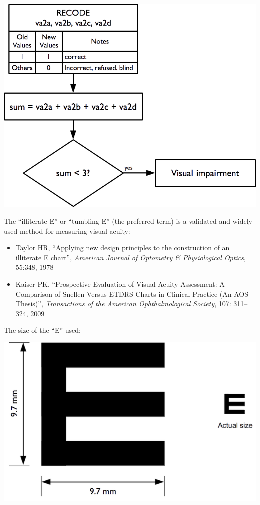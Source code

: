 \documentclass[12pt,a4paper]{book}
\theoremstyle{definition}
\theoremstyle{definition}
\theoremstyle{definition}
\theoremstyle{remark}
\begin{document}
\begin{center}\includegraphics[width=9.76in]{figures/indicators27} \end{center}

The ``illiterate E'' or ``tumbling E'' (the preferred term) is a
validated and widely used method for measuring visual acuity:

\begin{itemize}
\item
  Taylor HR, ``Applying new design principles to the construction of an
  illiterate E chart'', \emph{American Journal of Optometry \&
  Physiological Optics}, 55:348, 1978
\item
  Kaiser PK, ``Prospective Evaluation of Visual Acuity Assessment: A
  Comparison of Snellen Versus ETDRS Charts in Clinical Practice (An AOS
  Thesis)'', \emph{Transactions of the American Ophthalmological
  Society}, 107: 311--324, 2009
\end{itemize}

\newpage

The size of the ``E'' used:

\begin{center}\includegraphics[width=8.33in]{figures/indicators28} \end{center}
\end{document}
